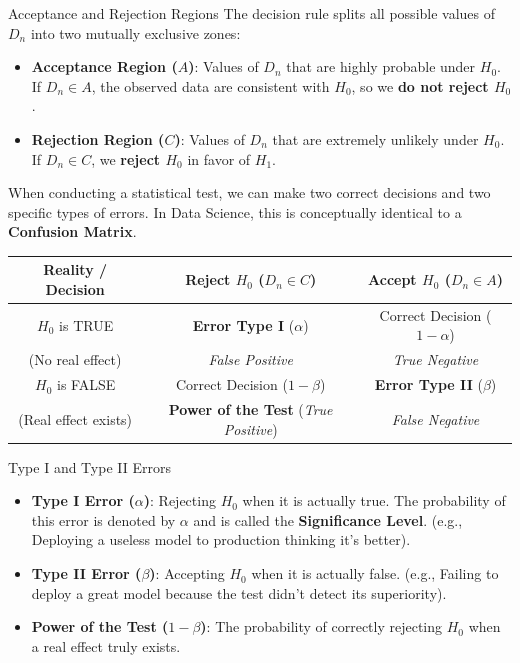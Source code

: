 \begin{defbox}{Acceptance and Rejection Regions}
 The decision rule splits all possible values of $D_n$ into two mutually exclusive zones:
 \begin{itemize}
\item \textbf{Acceptance Region ($A$)}: Values of $D_n$ that are highly probable under $H_0$. If $D_n \in A$, the observed data are consistent with $H_0$, so we \textbf{do not reject $H_0$}.
  
  \item \textbf{Rejection Region ($C$)}: Values of $D_n$ that are extremely unlikely under $H_0$. If $D_n \in C$, we \textbf{reject $H_0$} in favor of $H_1$.
 \end{itemize}
\end{defbox}

When conducting a statistical test, we can make two correct decisions and two specific types of errors. In Data Science, this is conceptually identical to a \textbf{Confusion Matrix}.

\vspace{0.3cm}
\begin{center}
\renewcommand{\arraystretch}{1.5}
\begin{tabular}{|c|c|c|}
\hline
\textbf{Reality / Decision} & \textbf{Reject $H_0$ ($D_n \in C$)} & \textbf{Accept $H_0$ ($D_n \in A$)} \\
\hline
$H_0$ is TRUE & \textbf{Error Type I} ($\alpha$) & Correct Decision ($1 - \alpha$) \\
 (No real effect) & \textit{False Positive} & \textit{True Negative} \\
\hline
$H_0$ is FALSE & Correct Decision ($1 - \beta$) & \textbf{Error Type II} ($\beta$) \\
 (Real effect exists) & \textbf{Power of the Test} (\textit{True Positive}) & \textit{False Negative} \\
\hline
\end{tabular}
\end{center}

\vspace{0.25cm}
\begin{defbox}{Type I and Type II Errors}
 \begin{itemize}
  \item \textbf{Type I Error ($\alpha$)}: Rejecting $H_0$ when it is actually true. The probability of this error is denoted by $\alpha$ and is called the \textbf{Significance Level}. (e.g., Deploying a useless model to production thinking it's better).
  
  \item \textbf{Type II Error ($\beta$)}: Accepting $H_0$ when it is actually false. (e.g., Failing to deploy a great model because the test didn't detect its superiority).
  
  \item \textbf{Power of the Test ($1 - \beta$)}: The probability of correctly rejecting $H_0$ when a real effect truly exists.
 \end{itemize}
\end{defbox}

